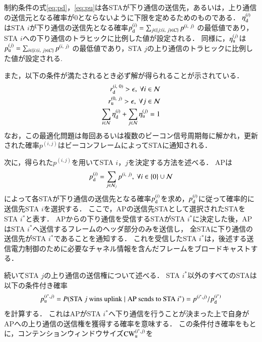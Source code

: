 \documentclass[master]{kuisthesis}		%
\newcommand{\mN}{{\mathcal N}}
\newcommand{\pij}{p^{(i,j)}}
\begin{document}
			制約条件の式\eqref{eq:pd}，\eqref{eq:pu}は各STAが下り通信の送信先，あるいは，上り通信の送信元となる確率が0とならないように下限を定めるためのものである．
			$\eta_{\rm d}^{(i)}$はSTA $i$が下り通信の送信先となる確率$p_{\rm d}^{(i)}=\sum_{j\in\{j:(i,\ j)\in{\mathcal C}\}} p^{(i,\ j)}$
			の最低値であり，STA $i$への下り通信のトラヒックに比例した値が設定される．
			同様に，$\eta_{\rm u}^{(j)}$は$p_{\rm u}^{(j)}=\sum_{i\in\{i:(i,\ j)\in{\mathcal C}\}} p^{(i,\ j)}$
			の最低値であり，STA $j$の上り通信のトラヒックに比例した値が設定される.
			\par
			また，以下の条件が満たされるとき必ず解が得られることが示されている．
			\begin{align}
				r_{\rm d}^{(i,\ 0)} >\epsilon,\ \forall i\in\mN \\
				r_{\rm u}^{(0,\ j)} >\epsilon,\ \forall j\in\mN \\
				\sum_{i\in\mN}\eta_{\rm d}^{(i)} + \sum_{j\in\mN}\eta_{\rm u}^{(j)} =1 \label{eq:feasible}
			\end{align}
			なお，この最適化問題は毎回あるいは複数のビーコン信号周期毎に解かれ，更新された確率$\pij$はビーコンフレームによってSTAに通知される．
			\par
			次に，得られた$\pij$を用いてSTA $i$，$j$を決定する方法を述べる．
			APは
			\begin{equation}
				p_{\rm d}^{(i)}= \sum_{j\in{\mathcal N}_j}p^{(i,\ j)},\ \forall i \in \{0\}\cup{\mathcal N}
			\end{equation}
			によって各STAが下り通信の送信先となる確率$p_{\rm d}^{(i)}$を求め，$p_{\rm d}^{(i)}$に従って確率的に送信先STA $i$を選択する．
			ここで，APの送信先STAとして選択されたSTAをSTA $i^*$と表す．
			APからの下り通信を受信するSTAがSTA $i^*$に決定した後，APはSTA $i^*$へ送信するフレームのヘッダ部分のみを送信し，
			全STAに下り通信の送信先がSTA $i^*$であることを通知する．
			これを受信したSTA $i^*$は，後述する送信電力制御のために必要なチャネル情報を含んだフレームをブロードキャストする．
			\par
			続いてSTA $j$の上り通信の送信権について述べる．
			STA $i^*$以外のすべてのSTAは以下の条件付き確率
			\begin{equation}
				p_{\rm u}^{(i^*,j)} = P({\rm STA}\ j\ {\rm wins\ uplink}\mid{\rm AP\ sends\ to}\ {\rm STA}\ i^*)=p^{(i^*,j)} / p_{\rm d}^{(i^*)} \label{eq:win}
			\end{equation}
			を計算する．
			これはAPがSTA $i^*$へ下り通信を行うことが決まった上で自身がAPへの上り通信の送信権を獲得する確率を意味する．
			この条件付き確率をもとに，コンテンションウィンドウサイズ${\rm CW}^{(i^*,j)}_{\rm u}$を
\end{document}
